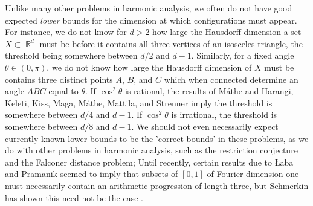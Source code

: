 \documentclass[11pt]{article}
\DeclareMathOperator{\QQ}{\mathbb{Q}}
\DeclareMathOperator{\RR}{\mathbb{R}}
\begin{document}
Unlike many other problems in harmonic analysis, we often do not have good expected \emph{lower} bounds for the dimension at which configurations must appear.
%
For instance, we do not know for $d > 2$ how large the Hausdorff dimension a set $X \subset \RR^d$ must be before it contains all three vertices of an isosceles triangle, the threshold being somewhere between $d/2$ and $d-1$. Similarly, for a fixed angle $\theta \in (0,\pi)$, we do not know how large the Hausdorff dimension of $X$ must be contains three distinct points $A$, $B$, and $C$ which when connected determine an angle $ABC$ equal to $\theta$. If $\cos^2 \theta$ is rational, the results of M\'{a}the \cite{Mathe} and Harangi, Keleti, Kiss, Maga, M\'{a}the, Mattila, and Strenner \cite{Harangi} imply the threshold is somewhere between $d/4$  and $d-1$. If $\cos^2 \theta$ is irrational, the threshold is somewhere between $d/8$ and $d-1$. 
We should not even necessarily expect currently known lower bounds to be the 'correct bounds' in these problems, as we do with other problems in harmonic analysis, such as the restriction conjecture and the Falconer distance problem; Until recently, certain results due to {\L}aba and Pramanik \cite{LabaPramanik} seemed to imply that subsets of $[0,1]$ of Fourier dimension one must necessarily contain an arithmetic progression of length three, but Schmerkin has shown this need not be the case \cite{Schmerkin}.
\end{document}
